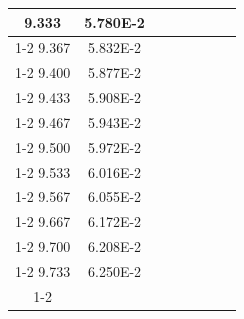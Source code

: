 \documentclass[article,12pt]{elsarticle}
\begin{document}
\begin{longtable}[c]{|c|c|cccccc}
9.333    & 5.780E-2  &                       &                              &                            &                       &                              &                               \\ \cline{1-2}
9.367    & 5.832E-2  &                       &                              &                            &                       &                              &                               \\ \cline{1-2}
9.400    & 5.877E-2  &                       &                              &                            &                       &                              &                               \\ \cline{1-2}
9.433    & 5.908E-2  &                       &                              &                            &                       &                              &                               \\ \cline{1-2}
9.467    & 5.943E-2  &                       &                              &                            &                       &                              &                               \\ \cline{1-2}
9.500    & 5.972E-2  &                       &                              &                            &                       &                              &                               \\ \cline{1-2}
9.533    & 6.016E-2  &                       &                              &                            &                       &                              &                               \\ \cline{1-2}
9.567    & 6.055E-2  &                       &                              &                            &                       &                              &                               \\ \cline{1-2}
9.667    & 6.172E-2  &                       &                              &                            &                       &                              &                               \\ \cline{1-2}
9.700    & 6.208E-2  &                       &                              &                            &                       &                              &                               \\ \cline{1-2}
9.733    & 6.250E-2  &                       &                              &                            &                       &                              &                               \\ \cline{1-2}

\end{longtable}
\end{document}

